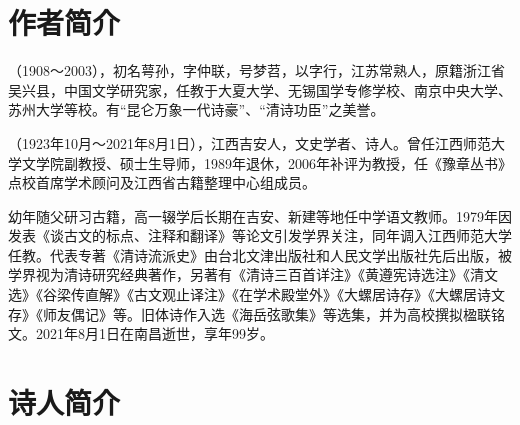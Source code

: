 

\section{作者简介}

\begin{description}[
  before={\setcounter{myterm}{0}}, %
  font={\stepcounter{myterm}\arabic{myterm}.~\bfseries}, %
  labelsep=0.5em,
  leftmargin=3em %
]
  \item [钱仲联] （1908～2003），初名萼孙，字仲联，号梦苕，以字行，江苏常熟人，原籍浙江省吴兴县，中国文学研究家，任教于大夏大学、无锡国学专修学校、南京中央大学、苏州大学等校。有“昆仑万象一代诗豪”、“清诗功臣”之美誉。
  \item [刘世南] （1923年10月～2021年8月1日），江西吉安人，文史学者、诗人。曾任江西师范大学文学院副教授、硕士生导师，1989年退休，2006年补评为教授，任《豫章丛书》点校首席学术顾问及江西省古籍整理中心组成员。\par
        幼年随父研习古籍，高一辍学后长期在吉安、新建等地任中学语文教师。1979年因发表《谈古文的标点、注释和翻译》等论文引发学界关注，同年调入江西师范大学任教。代表专著《清诗流派史》由台北文津出版社和人民文学出版社先后出版，被学界视为清诗研究经典著作，另著有《清诗三百首详注》《黄遵宪诗选注》《清文选》《谷梁传直解》《古文观止译注》《在学术殿堂外》《大螺居诗存》《大螺居诗文存》《师友偶记》等。旧体诗作入选《海岳弦歌集》等选集，并为高校撰拟楹联铭文。2021年8月1日在南昌逝世，享年99岁。
\end{description}

\section{诗人简介}

